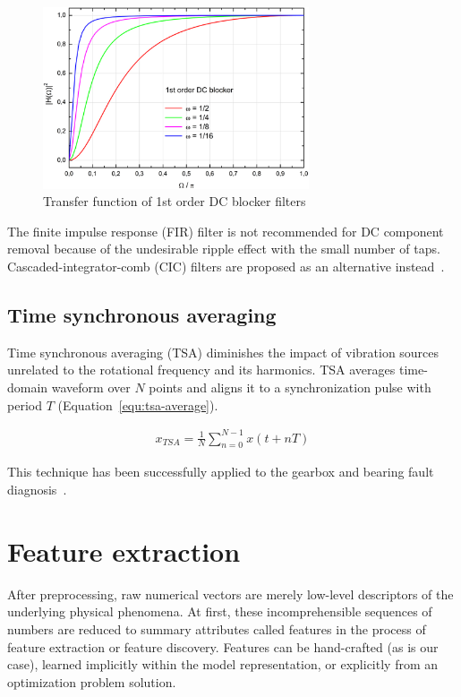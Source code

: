 \begin{figure}[h]
	\centering
	\includegraphics[width=0.7\textwidth]{assets/analysis/iir-1-dc-blocker-band.jpg}
	\caption{Transfer function of 1st order DC blocker filters ~\cite{tittelbach-helmrich_digital_2021}}
	\label{fig:dc-blocker}
\end{figure}

The finite impulse response (FIR) filter is not recommended for DC component removal because of the undesirable ripple effect with the small number of taps. Cascaded-integrator-comb (CIC) filters are proposed as an alternative instead~\cite{lyons_understanding_2011}.

\subsection{Time synchronous averaging}
Time synchronous averaging (TSA) diminishes the impact of vibration sources unrelated to the rotational frequency and its harmonics. TSA averages time-domain waveform over $N$ points and aligns it to a synchronization pulse with period $T$ (Equation~\ref{equ:tsa-average}).

\begin{ceqn}\begin{align}
x_{TSA} = \frac{1}{N} \sum_{n = 0}^{N - 1}{x(t + nT)}
\label{equ:tsa-average}
\end{align}\end{ceqn}

This technique has been successfully applied to the gearbox and bearing fault diagnosis~\cite{davies_handbook_2012,nandi_condition_2019}.

\section{Feature extraction} \label{section:feature-extraction}
After preprocessing, raw numerical vectors are merely low-level descriptors of the underlying physical phenomena. At first, these incomprehensible sequences of numbers are reduced to summary attributes called features in the process of feature extraction or feature discovery. Features can be hand-crafted (as is our case), learned implicitly within the model representation, or explicitly from an optimization problem solution.

